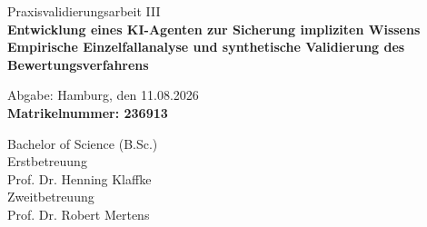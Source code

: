 \documentclass[
  10pt,
  ngerman,
  a4paper,
  toc=graduated,
  numbers=noenddot,
  headings=standardclasses,
  nonumberlist
]{scrartcl}
\begin{document}
\hypersetup{pageanchor=false}
\thispagestyle{empty}

\vspace{1cm}

\begin{figure}[htbp]
    \centering

    \begin{minipage}[t]{0.45\textwidth}
        \raggedright
        
    \end{minipage}
    \hfill
    \begin{minipage}[t]{0.45\textwidth}
        \raggedleft
        
    \end{minipage}

\end{figure}

\vspace{1cm}
\begin{center}
	{\Large Praxisvalidierungsarbeit III} \\
	\vspace{3cm}
	{\huge \textbf{Entwicklung eines KI-Agenten zur Sicherung impliziten Wissens}}\\
    \vspace{0.3cm}
    {\LARGE \textbf{{Empirische Einzelfallanalyse und synthetische Validierung des Bewertungsverfahrens}}}\\
    
\end{center}

\vspace{1.5cm}
\begin{center}
	Abgabe: Hamburg, den 11.08.2026\\[3\baselineskip]
	\textbf{\textcolor{ihk_blue}{Matrikelnummer: 236913}}

    Bachelor of Science (B.Sc.) \\[4\baselineskip]
	
	Erstbetreuung \\
    Prof. Dr. Henning Klaffke \\[2\baselineskip]

    Zweitbetreuung \\
    Prof. Dr. Robert Mertens \\

\end{center}
\end{document}
